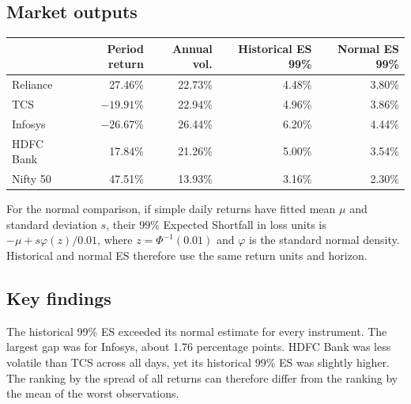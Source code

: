 \documentclass[12pt,a4paper]{article}
\begin{document}
\subsection{Market outputs}
\begin{center}\small\begin{tabular}{lrrrr}\toprule
&Period return&Annual vol.&Historical ES 99\%&Normal ES 99\%\\\midrule
Reliance&27.46\%&22.73\%&4.48\%&3.80\%\\
TCS&$-19.91$\%&22.94\%&4.96\%&3.86\%\\
Infosys&$-26.67$\%&26.44\%&6.20\%&4.44\%\\
HDFC Bank&17.84\%&21.26\%&5.00\%&3.54\%\\
Nifty 50&47.51\%&13.93\%&3.16\%&2.30\%\\\bottomrule\end{tabular}\par\nopagebreak{}\end{center}
For the normal comparison, if simple daily returns have fitted mean $\mu$ and standard deviation $s$, their 99\% Expected Shortfall in loss units is $-\mu+s\varphi(z)/0.01$, where $z=\Phi^{-1}(0.01)$ and $\varphi$ is the standard normal density. Historical and normal ES therefore use the same return units and horizon.
\subsection{Key findings}
The historical 99\% ES exceeded its normal estimate for every instrument. The largest gap was for Infosys, about 1.76 percentage points. HDFC Bank was less volatile than TCS across all days, yet its historical 99\% ES was slightly higher. The ranking by the spread of all returns can therefore differ from the ranking by the mean of the worst observations.
 
\end{document}
